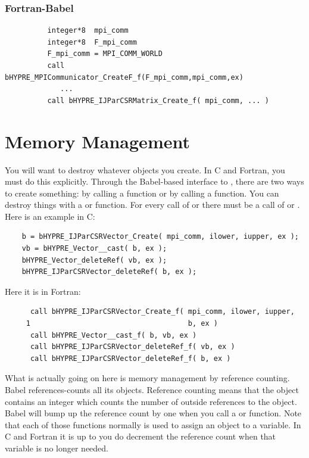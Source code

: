 \subsubsection{Fortran-Babel}
\begin{verbatim}
          integer*8  mpi_comm
          integer*8  F_mpi_comm
          F_mpi_comm = MPI_COMM_WORLD
          call bHYPRE_MPICommunicator_CreateF_f(F_mpi_comm,mpi_comm,ex)
             ...
          call bHYPRE_IJParCSRMatrix_Create_f( mpi_comm, ... )
\end{verbatim}

\section{Memory Management}
\label{sec-Memory}

You will want to destroy whatever objects you create.  In C and
Fortran, you must do this explicitly.  Through the Babel-based
interface to \hypre{}, there are two ways to create something: by
calling a  function or by calling a
 function. You can destroy things with a 
or  function.  For every call of  or
 there must be a call of  or
.  Here is an example in C:
\begin{verbatim}
    b = bHYPRE_IJParCSRVector_Create( mpi_comm, ilower, iupper, ex );
    vb = bHYPRE_Vector__cast( b, ex );
    bHYPRE_Vector_deleteRef( vb, ex );
    bHYPRE_IJParCSRVector_deleteRef( b, ex );
\end{verbatim}
Here it is in Fortran:
\begin{verbatim}
      call bHYPRE_IJParCSRVector_Create_f( mpi_comm, ilower, iupper,
     1                                     b, ex )
      call bHYPRE_Vector__cast_f( b, vb, ex )
      call bHYPRE_IJParCSRVector_deleteRef_f( vb, ex )
      call bHYPRE_IJParCSRVector_deleteRef_f( b, ex )
\end{verbatim}

What is actually going on here is memory management by reference
counting.  Babel references-counts all its objects.  Reference
counting means that the object contains an integer which counts the
number of outside references to the object.  Babel will bump up the
reference count by one when you call a  or 
function.  Note that each of those functions normally is used to
assign an object to a variable.  In C and Fortran it is up to you do
decrement the reference count when that variable is no longer needed.

